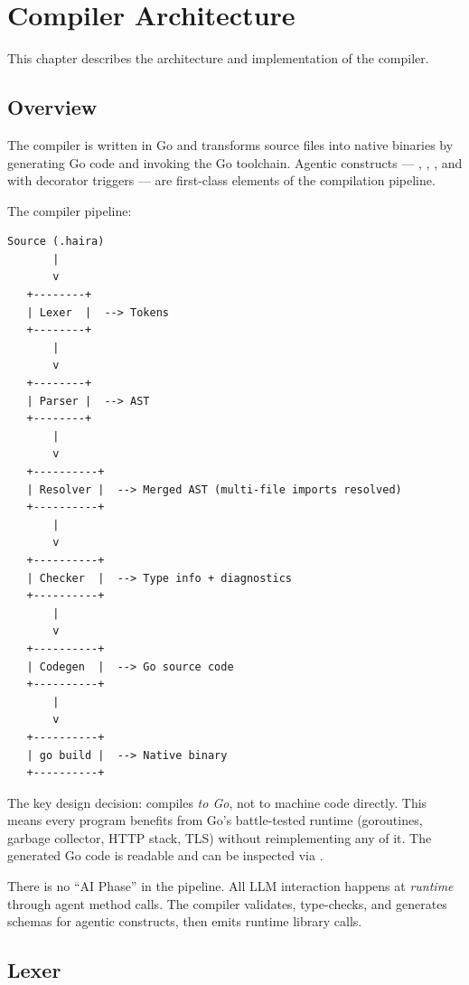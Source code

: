 \chapter{Compiler Architecture}
\label{ch:compiler}

This chapter describes the architecture and implementation of the \haira{} compiler.

\section{Overview}

The \haira{} compiler is written in Go and transforms  source files into native binaries by generating Go code and invoking the Go toolchain. Agentic constructs --- , , , and  with  decorator triggers --- are first-class elements of the compilation pipeline.

The compiler pipeline:

\begin{lstlisting}[language={},numbers=none]
Source (.haira)
       |
       v
   +--------+
   | Lexer  |  --> Tokens
   +--------+
       |
       v
   +--------+
   | Parser |  --> AST
   +--------+
       |
       v
   +----------+
   | Resolver |  --> Merged AST (multi-file imports resolved)
   +----------+
       |
       v
   +----------+
   | Checker  |  --> Type info + diagnostics
   +----------+
       |
       v
   +----------+
   | Codegen  |  --> Go source code
   +----------+
       |
       v
   +----------+
   | go build |  --> Native binary
   +----------+
\end{lstlisting}

The key design decision: \haira{} compiles \emph{to Go}, not to machine code directly. This means every \haira{} program benefits from Go's battle-tested runtime (goroutines, garbage collector, HTTP stack, TLS) without reimplementing any of it. The generated Go code is readable and can be inspected via .

\begin{note}
There is no ``AI Phase'' in the pipeline. All LLM interaction happens at \emph{runtime} through agent method calls. The compiler validates, type-checks, and generates schemas for agentic constructs, then emits runtime library calls.
\end{note}

\section{Lexer}

